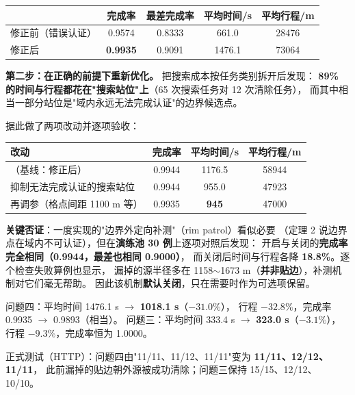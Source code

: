 \begin{center}
\begin{tabular}{lcccc}
\toprule
 & 完成率 & 最差完成率 & 平均时间/s & 平均行程/m \\ \midrule
修正前（错误认证） & 0.9574 & 0.8333 & 661.0 & 28476 \\
修正后 & \textbf{0.9935} & 0.9091 & 1476.1 & 73064 \\
\bottomrule
\end{tabular}
\end{center}

\textbf{第二步：在正确的前提下重新优化。} 把搜索成本按任务类别拆开后发现：
\textbf{89\% 的时间与行程都花在"搜索站位"上}（65 次搜索任务对 12 次清除任务），
而其中相当一部分站位是"域内永远无法完成认证"的边界候选点。

据此做了两项改动并逐项验收：

\begin{center}
\begin{tabular}{lccc}
\toprule
改动 & 完成率 & 平均时间/s & 平均行程/m \\ \midrule
（基线：修正后） & 0.9944 & 1176.5 & 58944 \\
抑制无法完成认证的搜索站位 & 0.9944 & 955.0 & 47923 \\
再调参（格点间距 1100 m 等） & 0.9935 & \textbf{945} & 47000 \\
\bottomrule
\end{tabular}
\end{center}

\textbf{关键否证}：一度实现的"边界外定向补测"（rim patrol）看似必要
（定理 2 说边界点在域内不可认证），但在\textbf{演练池 30 例}上逐项对照后发现：
开启与关闭的\textbf{完成率完全相同（0.9944，最差也相同 0.9000）}，
而关闭后时间与行程各降 \textbf{18.8\%}。逐个检查失败算例也显示，
漏掉的源半径多在 1158$\sim$1673 m（\textbf{并非贴边}），补测机制对它们毫无帮助。
因此该机制\textbf{默认关闭}，只在需要时作为可选项保留。

\begin{keybox}[title=最终验收（独立算例池，从未参与调参）]
问题四：平均时间 1476.1 s $\to$ \textbf{1018.1 s}（$-31.0\%$），
行程 $-32.8\%$，完成率 0.9935 $\to$ 0.9893（相当）。
问题三：平均时间 333.4 s $\to$ \textbf{323.0 s}（$-3.1\%$），行程 $-9.3\%$，完成率恒为 1.0000。\par
正式测试（HTTP）：问题四由"11/11、11/12、11/11"变为 \textbf{11/11、12/12、11/11}，
此前漏掉的贴边朝外源被成功清除；问题三保持 15/15、12/12、10/10。
\end{keybox}

